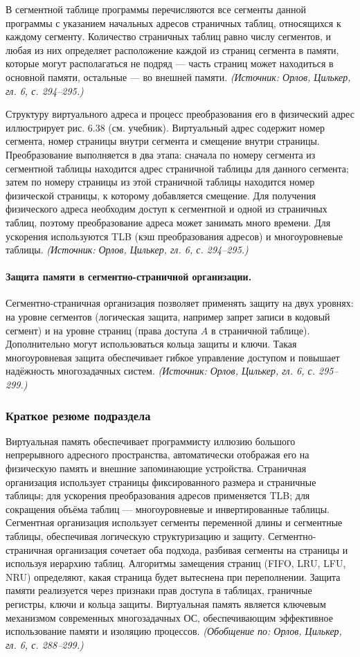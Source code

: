 \documentclass[a4paper,12pt]{article}
\begin{document}
В сегментной таблице программы перечисляются все сегменты данной программы с указанием начальных адресов страничных таблиц, относящихся к каждому сегменту. Количество страничных таблиц равно числу сегментов, и любая из них определяет расположение каждой из страниц сегмента в памяти, которые могут располагаться не подряд --- часть страниц может находиться в основной памяти, остальные --- во внешней памяти.
\textit{(Источник: Орлов, Цилькер, гл. 6, с. 294--295.)}

Структуру виртуального адреса и процесс преобразования его в физический адрес иллюстрирует рис. 6.38 (см. учебник). Виртуальный адрес содержит номер сегмента, номер страницы внутри сегмента и смещение внутри страницы. Преобразование выполняется в два этапа: сначала по номеру сегмента из сегментной таблицы находится адрес страничной таблицы для данного сегмента; затем по номеру страницы из этой страничной таблицы находится номер физической страницы, к которому добавляется смещение. Для получения физического адреса необходим доступ к сегментной и одной из страничных таблиц, поэтому преобразование адреса может занимать много времени. Для ускорения используются TLB (кэш преобразования адресов) и многоуровневые таблицы.
\textit{(Источник: Орлов, Цилькер, гл. 6, с. 294--295.)}

\paragraph{Защита памяти в сегментно-страничной организации.}
Сегментно-страничная организация позволяет применять защиту на двух уровнях: на уровне сегментов (логическая защита, например запрет записи в кодовый сегмент) и на уровне страниц (права доступа \(A\) в страничной таблице). Дополнительно могут использоваться кольца защиты и ключи. Такая многоуровневая защита обеспечивает гибкое управление доступом и повышает надёжность многозадачных систем.
\textit{(Источник: Орлов, Цилькер, гл. 6, с. 295--299.)}

\subsubsection{Краткое резюме подраздела}
Виртуальная память обеспечивает программисту иллюзию большого непрерывного адресного пространства, автоматически отображая его на физическую память и внешние запоминающие устройства. Страничная организация использует страницы фиксированного размера и страничные таблицы; для ускорения преобразования адресов применяется TLB; для сокращения объёма таблиц --- многоуровневые и инвертированные таблицы. Сегментная организация использует сегменты переменной длины и сегментные таблицы, обеспечивая логическую структуризацию и защиту. Сегментно-страничная организация сочетает оба подхода, разбивая сегменты на страницы и используя иерархию таблиц. Алгоритмы замещения страниц (FIFO, LRU, LFU, NRU) определяют, какая страница будет вытеснена при переполнении. Защита памяти реализуется через признаки прав доступа в таблицах, граничные регистры, ключи и кольца защиты. Виртуальная память является ключевым механизмом современных многозадачных ОС, обеспечивающим эффективное использование памяти и изоляцию процессов.
\textit{(Обобщение по: Орлов, Цилькер, гл. 6, с. 288--299.)}
\end{document}
